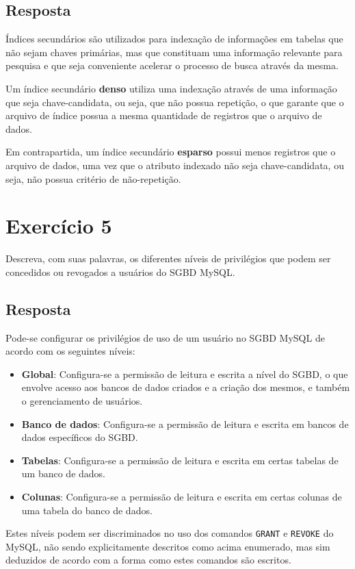 \documentclass[article, a4paper, oneside, 11pt, english, brazil, sumario=tradicional]{abntex2}
\begin{document}
\subsection{Resposta}
\label{sec:org66c6511}

Índices secundários são utilizados para  indexação de informações em tabelas que
não sejam  chaves primárias,  mas que constituam  uma informação  relevante para
pesquisa e que seja conveniente acelerar o processo de busca através da mesma.

Um índice secundário \textbf{denso} utiliza uma indexação através de uma informação que
seja  chave-candidata, ou  seja, que  não possua  repetição, o  que garante  que
o arquivo  de índice  possua a mesma  quantidade de registros  que o  arquivo de
dados.

Em contrapartida,  um índice secundário  \textbf{esparso} possui menos registros  que o
arquivo de dados,  uma vez que o atributo indexado  não seja chave-candidata, ou
seja, não possua critério de não-repetição.

\section{Exercício 5}
\label{sec:orgf5e96fe}

Descreva, com suas  palavras, os diferentes níveis de privilégios  que podem ser
concedidos ou revogados a usuários do SGBD MySQL.

\subsection{Resposta}
\label{sec:orgb596326}

Pode-se configurar os privilégios  de uso de um usuário no  SGBD MySQL de acordo
com os seguintes níveis:

\begin{itemize}
\item \textbf{Global}: Configura-se a permissão de leitura e escrita a nível do SGBD, o que
envolve acesso aos bancos de dados criados  e a criação dos mesmos, e também o
gerenciamento de usuários.
\item \textbf{Banco de dados}:  Configura-se a permissão de leitura e  escrita em bancos de
dados específicos do SGBD.
\item \textbf{Tabelas}: Configura-se a permissão de leitura  e escrita em certas tabelas de
um banco de dados.
\item \textbf{Colunas}: Configura-se a permissão de leitura  e escrita em certas colunas de
uma tabela do banco de dados.
\end{itemize}

Estes níveis podem  ser discriminados no uso dos comandos  \texttt{GRANT} e \texttt{REVOKE} do
MySQL,  não  sendo  explicitamente  descritos  como  acima  enumerado,  mas  sim
deduzidos de acordo com a forma como estes comandos são escritos.
\end{document}
